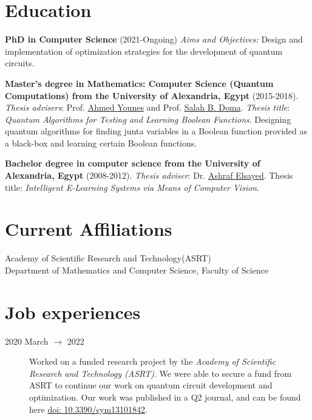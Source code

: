 \documentclass[margin,line,a4paper]{resume}
\newcommand*{\doi}[1]{\href{http://dx.doi.org/#1}{doi: #1}}
\begin{document}
\begin{resume}
        
    \section{\mysidestyle Education} 
    \textbf{PhD in Computer Science} (2021-Ongoing)
     \emph{Aims and Objectives:} Design and implementation of optimization strategies for the development of quantum circuits.    

    \textbf{Master's degree in Mathematics: Computer Science (Quantum Computations) from the University of Alexandria, Egypt} (2015-2018). 
    \emph{Thesis advisers}: Prof.  \href{https://scholar.google.com.eg/citations?user=CZz2XFIAAAAJ&hl=en}{Ahmed Younes} and Prof. \href{https://scholar.google.com.eg/citations?hl=en&user=YFeMsegAAAAJ&view_op=list_works&sortby=pubdate}{Salah B. Doma}. 
     \emph{Thesis title}: \textit{Quantum Algorithms for Testing and Learning Boolean Functions}. Designing quantum algorithms for finding junta variables in a Boolean function provided as a black-box and learning certain Boolean functions.

    \textbf{Bachelor degree in computer science from the University of Alexandria, Egypt}
    (2008-2012).  \emph{Thesis adviser}: Dr. \href{https://scholar.google.com.eg/citations?hl=en&user=G9tQkdIAAAAJ&view_op=list_works&sortby=pubdate}{Ashraf Elsayed}.
    Thesis title: \textit{Intelligent E-Learning Systems via Means of Computer Vision.}
  

\section{\mysidestyle Current Affiliations}\vspace{1mm}
\begin{description}
    \item[Academy of Scientific Research and Technology(ASRT)]
    \item[Department of Mathematics and Computer Science, Faculty of Science] 
\end{description}


\section{\mysidestyle Job experiences}\vspace{1mm}
\begin{description}
    

    \item[2020 March $\rightarrow$ 2022] Worked on a funded research project by the \textit{Academy of Scientific Research and Technology (ASRT)}. We were able to secure a fund from ASRT to continue our work on quantum circuit development and optimization. Our work was published in a Q2 journal, and can be found here \doi{10.3390/sym13101842}.


\end{description}
\end{resume}
\end{document}
